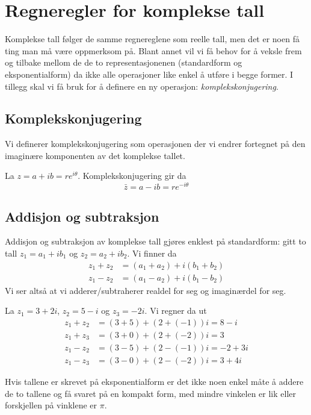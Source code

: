 \documentclass[a4paper,norsk,12pt]{article}
\newcounter{exa}
\begin{document}
\section{Regneregler for komplekse tall}
Komplekse tall følger de samme regnereglene som reelle tall, men det er noen få ting man må være oppmerksom på. Blant annet vil vi få behov for å veksle frem og tilbake mellom de de to representasjonenen (standardform og eksponentialform) da ikke alle operasjoner like enkel å utføre i begge former. I tillegg skal vi få bruk for å definere en ny operasjon: \emph{komplekskonjugering}.

\subsection{Komplekskonjugering}
Vi definerer komplekskonjugering som operasjonen der vi endrer fortegnet på den imaginære komponenten av det komplekse tallet. 
\begin{tdef}
	La $z = a + ib = re^{i\theta}$. Komplekskonjugering gir da
	\begin{displaymath}
		\bar{z} = a-ib = re^{-i\theta}
	\end{displaymath}
\end{tdef}

\subsection{Addisjon og subtraksjon}
Addisjon og subtraksjon av komplekse tall gjøres enklest på standardform: gitt to tall $z_1 = a_1 + ib_1$ og $z_2 = a_2 + ib_2$. Vi finner da
\begin{align*}
	z_1 + z_2 &= (a_1+a_2) + i(b_1+b_2) \\
	z_1 - z_2 &= (a_1-a_2) + i(b_1-b_2) 
\end{align*}
Vi ser altså at vi adderer/subtraherer realdel for seg og imaginærdel for seg.

\begin{texample}
	La $z_1 = 3+ 2i$, $z_2 = 5-i$ og $z_3 = -2i$. Vi regner da ut
	\begin{align*}
		z_1 + z_2 &= (3+5) + (2+(-1))i = 8 - i \\ 
		z_1 + z_3 &= (3+0) + (2+(-2))i = 3 \\
		z_1 - z_2 &= (3-5) + (2-(-1))i = -2 + 3i \\ 
		z_1 - z_3 &= (3-0) + (2-(-2))i = 3 + 4i 
	\end{align*}
\end{texample}
Hvis tallene er skrevet på eksponentialform er det ikke noen enkel måte å addere de to tallene og få svaret på en kompakt form, med mindre vinkelen er lik eller forskjellen på vinklene er $\pi$.
\end{document}
